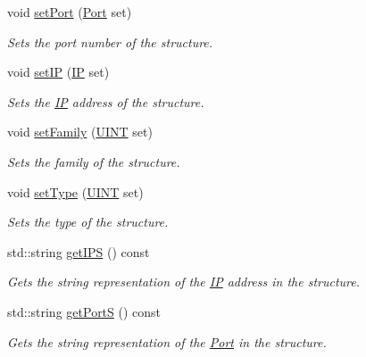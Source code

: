 \begin{DoxyCompactItemize}
void \hyperlink{class_communication_1_1_socket_structure_aab30d1c41344f14aab469241afbfd69c}{set\+Port} (\hyperlink{class_communication_1_1_port}{Port} set)
\begin{DoxyCompactList}\small\item\em Sets the port number of the structure. \end{DoxyCompactList}\item 
void \hyperlink{class_communication_1_1_socket_structure_acd8abd4bf53dc625807f3e487e20f69e}{set\+I\+P} (\hyperlink{class_communication_1_1_i_p}{I\+P} set)
\begin{DoxyCompactList}\small\item\em Sets the \hyperlink{class_communication_1_1_i_p}{I\+P} address of the structure. \end{DoxyCompactList}\item 
void \hyperlink{class_communication_1_1_socket_structure_aa8d9e7b4c27b016f1afe91cbc14292b1}{set\+Family} (\hyperlink{typedefs_8h_a2e2c38961834f28c06e17e074eb00bc7}{U\+I\+N\+T} set)
\begin{DoxyCompactList}\small\item\em Sets the family of the structure. \end{DoxyCompactList}\item 
void \hyperlink{class_communication_1_1_socket_structure_a3b0e5dca91bbf9758ce5736cce2fd8db}{set\+Type} (\hyperlink{typedefs_8h_a2e2c38961834f28c06e17e074eb00bc7}{U\+I\+N\+T} set)
\begin{DoxyCompactList}\small\item\em Sets the type of the structure. \end{DoxyCompactList}\item 
std\+::string \hyperlink{class_communication_1_1_socket_structure_a00d0d9e10ff5d75c6717310adcca594b}{get\+I\+P\+S} () const 
\begin{DoxyCompactList}\small\item\em Gets the string representation of the \hyperlink{class_communication_1_1_i_p}{I\+P} address in the structure. \end{DoxyCompactList}\item 
std\+::string \hyperlink{class_communication_1_1_socket_structure_a01cdf61533d33bd9c0c58fcbd4431e79}{get\+Port\+S} () const 
\begin{DoxyCompactList}\small\item\em Gets the string representation of the \hyperlink{class_communication_1_1_port}{Port} in the structure. \end{DoxyCompactList}\item 

\end{DoxyCompactItemize}

